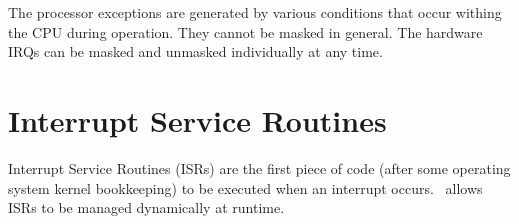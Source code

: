 The processor exceptions are generated by various conditions
that occur withing the CPU during operation.  They cannot
be masked in general.  The hardware IRQs can be masked and
unmasked individually at any time.


\section{Interrupt Service Routines}

Interrupt Service Routines (ISRs) are the first piece of code
(after some operating system kernel bookkeeping) to be executed
when an interrupt occurs.  \roadrunner\  allows ISRs to be
managed dynamically at runtime.
